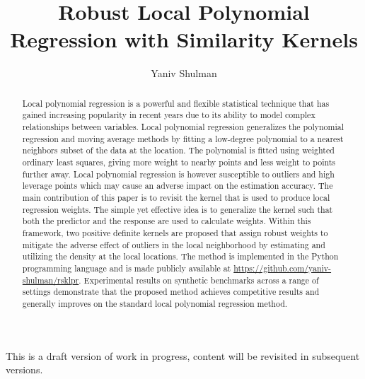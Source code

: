 \documentclass[preprint,1p,times]{elsarticle}
\begin{document}
\begin{frontmatter}

\vspace*{\fill}
\begin{center}
This is a draft version of work in progress, content will be revisited in subsequent versions.
\end{center}
\vspace*{\fill}
    
\title{Robust Local Polynomial Regression with Similarity Kernels}
\author{Yaniv Shulman}
\address{yaniv@aleph-zero.info}


\begin{abstract}
Local polynomial regression is a powerful and flexible statistical technique that has gained increasing popularity in recent years due to its ability to model complex relationships between variables. Local polynomial regression generalizes the polynomial regression and moving average methods by fitting a low-degree polynomial to a nearest neighbors subset of the data at the location. The polynomial is fitted using weighted ordinary least squares, giving more weight to nearby points and less weight to points further away. Local polynomial regression is however susceptible to outliers and high leverage points which may cause an adverse impact on the estimation accuracy. The main contribution of this paper is to revisit the kernel that is used to produce local regression weights. The simple yet effective idea is to generalize the kernel such that both the predictor and the response are used to calculate weights. Within this framework, two positive definite kernels are proposed that assign robust weights to mitigate the adverse effect of outliers in the local neighborhood by estimating and utilizing the density at the local locations. The method is implemented in the Python programming language and is made publicly available at \url{https://github.com/yaniv-shulman/rsklpr}. Experimental results on synthetic benchmarks across a range of settings demonstrate that the proposed method achieves competitive results and generally improves on the standard local polynomial regression method.
\end{abstract}
\end{frontmatter}
\end{document}
